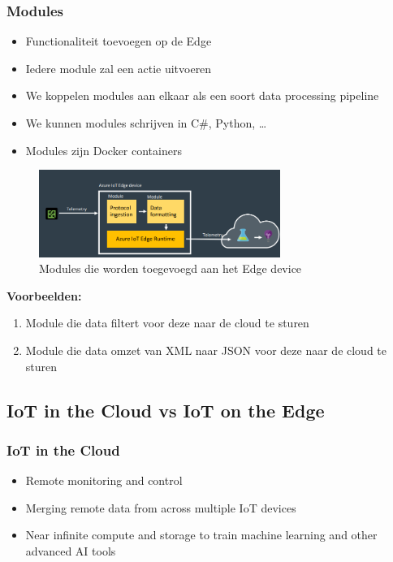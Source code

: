 \documentclass{article}
\newcommand{\bold}[1]{\textbf{#1}}
\begin{document}
\subsubsection{Modules}

\begin{itemize}
    \item Functionaliteit toevoegen op de Edge
    \item Iedere module zal een actie uitvoeren
    \item We koppelen modules aan elkaar als een soort data processing pipeline
    \item We kunnen modules schrijven in C\#, Python, \dots
    \item Modules zijn Docker containers
\end{itemize}

\begin{figure}[H]
    \centering
    \includegraphics[width=0.7\textwidth]{iot-edge4.png}
    \caption{Modules die worden toegevoegd aan het Edge device}
\end{figure}

\bold{Voorbeelden:}

\begin{enumerate}
    \item Module die data filtert voor deze naar de cloud te sturen
    \item Module die data omzet van XML naar JSON voor deze naar de cloud te sturen
\end{enumerate}

\subsection{IoT in the Cloud vs IoT on the Edge}

\subsubsection{IoT in the Cloud}

\begin{itemize}
    \item Remote monitoring and control
    \item Merging remote data from across multiple IoT devices
    \item Near infinite compute and storage to train machine learning and other advanced AI tools
\end{itemize}
\end{document}
